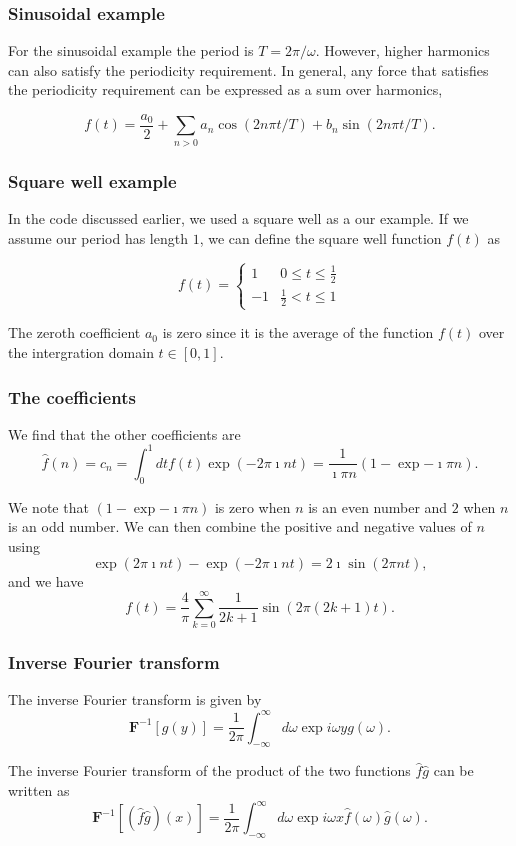 \documentclass{beamer}
\begin{document}
\begin{frame}
\frametitle{Sinusoidal example}

For the sinusoidal example the
period is $T=2\pi/\omega$. However, higher harmonics can also
satisfy the periodicity requirement. In general, any force that
satisfies the periodicity requirement can be expressed as a sum over
harmonics,

\[
f(t)=\frac{a_0}{2}+\sum_{n>0} a_n\cos(2n\pi t/T)+b_n\sin(2n\pi t/T).
\]
\end{frame}

\begin{frame}
\frametitle{Square well example}

In the code discussed earlier, we used a square well as a our
example. If we assume our period has length $1$, we can define the
square well function $f(t)$ as

\[
f(t)=\left\{\begin{array}{cc} 1 & 0 \le t \le \frac{1}{2} \\
                              -1 & \frac{1}{2} < t \le 1\end{array}\right.
\]

The zeroth coefficient $a_0$ is zero since it is the average of the function $f(t)$ over the intergration domain $t\in [0,1]$.
\end{frame}

\begin{frame}
\frametitle{The coefficients}

We find that the other coefficients are
\[
\hat{f}(n)=c_n=\int_0^1 dt f(t)\exp{(-2\pi\imath nt)}=\frac{1}{\imath\pi n}\left(1-\exp{-\imath\pi n}\right).
\]

We note that $(1-\exp{-\imath\pi n})$ is zero when $n$ is an even
number and $2$ when $n$ is an odd number. We can then combine the
positive and negative values of $n$ using
\[
\exp{(2\pi\imath nt)}-\exp{(-2\pi\imath nt)}=2\imath \sin{(2\pi nt)},
\]
and we have
\[
f(t)=\frac{4}{\pi}\sum_{k=0}^{\infty}\frac{1}{2k+1}\sin{(2\pi(2k+1)t)}.
\]
\end{frame}


\begin{frame}
\frametitle{Inverse Fourier transform}

The inverse Fourier transform is given by
\[
\bm{F}^{-1}[g(y)]=\frac{1}{2\pi}\int_{-\infty}^{\infty} d\omega \exp{i\omega y} g(\omega).
\]

The inverse Fourier transform of the product of the two functions $\hat{f}\hat{g}$ can be written as
\[
\bm{F}^{-1}[(\hat{f}\hat{g})(x)]=\frac{1}{2\pi}\int_{-\infty}^{\infty} d\omega \exp{i\omega x} \hat{f}(\omega)\hat{g}(\omega).
\]
\end{frame}
\end{document}
